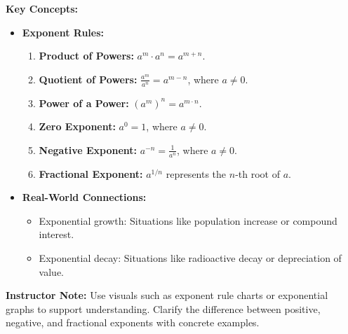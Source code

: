 \documentclass[12pt]{article}
\begin{document}
\begin{tcolorbox}[colframe=black!60, colback=white, 
coltitle=black, colbacktitle=black!15, fonttitle=\bfseries\Large, 
title=Key Concepts and Vocabulary, halign title=center, left=10pt, right=10pt, top=10pt, bottom=15pt]
\textbf{Key Concepts:}
\begin{itemize}
    \item \textbf{Exponent Rules:}
    \begin{enumerate}
        \item \textbf{Product of Powers:} \( a^m \cdot a^n = a^{m+n} \).
        \item \textbf{Quotient of Powers:} \( \frac{a^m}{a^n} = a^{m-n} \), where \( a \neq 0 \).
        \item \textbf{Power of a Power:} \( (a^m)^n = a^{m \cdot n} \).
        \item \textbf{Zero Exponent:} \( a^0 = 1 \), where \( a \neq 0 \).
        \item \textbf{Negative Exponent:} \( a^{-n} = \frac{1}{a^n} \), where \( a \neq 0 \).
        \item \textbf{Fractional Exponent:} \( a^{1/n} \) represents the \(n\)-th root of \(a\).
    \end{enumerate}
    \item \textbf{Real-World Connections:}
    \begin{itemize}
        \item Exponential growth: Situations like population increase or compound interest.
        \item Exponential decay: Situations like radioactive decay or depreciation of value.
    \end{itemize}
\end{itemize}

{\color{blue} \textbf{Instructor Note:} Use visuals such as exponent rule charts or exponential graphs to support understanding. Clarify the difference between positive, negative, and fractional exponents with concrete examples.}
\end{tcolorbox}

\vspace{1em}
\end{document}

